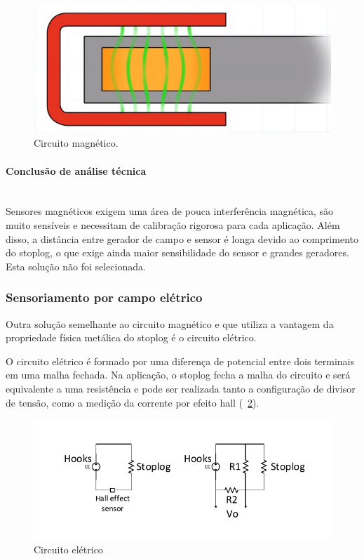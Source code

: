 \begin{figure}[H]
    \centering
    \includegraphics[width=0.5\columnwidth]{figs/magnetico/1.png}
    \caption{Circuito magnético.}
    \label{magnetico_1}
\end{figure}


 \paragraph{Conclusão de análise técnica}\mbox{}\\
Sensores magnéticos exigem uma área de pouca interferência magnética, são muito sensíveis e necessitam de calibração rigorosa para cada aplicação. Além disso, a distância entre gerador de campo e sensor é longa devido ao comprimento do stoplog, o que exige ainda maior sensibilidade do sensor e grandes geradores. Esta solução não foi selecionada.

\subsubsection{Sensoriamento por campo elétrico}
Outra solução semelhante ao circuito magnético e que utiliza a vantagem da propriedade física metálica do stoplog é o circuito elétrico.

O circuito elétrico é formado por uma diferença de potencial entre dois terminais em uma malha fechada. Na aplicação, o stoplog fecha a malha do circuito e será equivalente a uma resistência e pode ser realizada tanto a configuração de divisor de tensão, como a medição da corrente por efeito hall (~\ref{senseletrico_1}).

\begin{figure}[H]
    \centering
    \includegraphics[width=1\columnwidth]{figs/senseletrico/1.pdf}
    \caption{Circuito elétrico}
    \label{senseletrico_1}
\end{figure}


